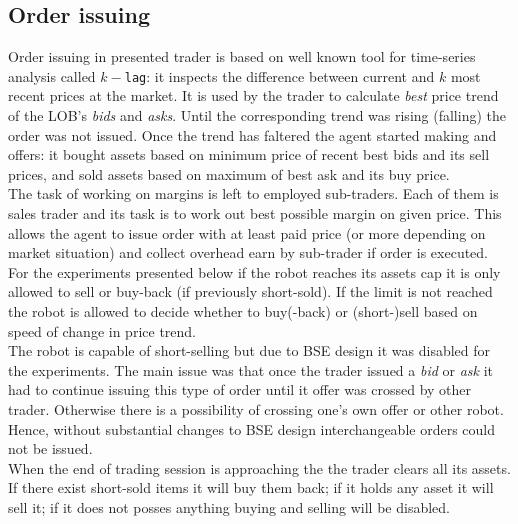 \documentclass{llncs}
\begin{document}
\subsection{Order issuing}
Order issuing in presented trader is based on well known tool for time-series analysis called $k-$\texttt{lag}: it inspects the difference between current and $k$ most recent prices at the market. It is used by the trader to calculate \emph{best} price trend of the LOB's \emph{bids} and \emph{asks}. Until the corresponding trend was rising (falling) the order was not issued. Once the trend has faltered the agent started making and offers: it bought assets based on minimum price of recent best bids and its sell prices, and sold assets based on maximum of best ask and its buy price.\\

The task of working on margins is left to employed sub-traders. Each of them is sales trader and its task is to work out best possible margin on given price. This allows the agent to issue order with at least paid price (or more depending on market situation) and collect overhead earn by sub-trader if order is executed.\\
For the experiments presented below if the robot reaches its assets cap it is only allowed to sell or buy-back (if previously short-sold). If the limit is not reached the robot is allowed to decide whether to buy(-back) or (short-)sell based on speed of change in price trend.\\

The robot is capable of short-selling but due to BSE design it was disabled for the experiments. The main issue was that once the trader issued a \emph{bid} or \emph{ask} it had to continue issuing this type of order until it offer was crossed by other trader. Otherwise there is a possibility of crossing one's own offer or other robot. Hence, without substantial changes to BSE design interchangeable orders could not be issued.\\

When the end of trading session is approaching the the trader clears all its assets. If there exist short-sold items it will buy them back; if it holds any asset it will sell it; if it does not posses anything buying and selling will be disabled.
\end{document}
